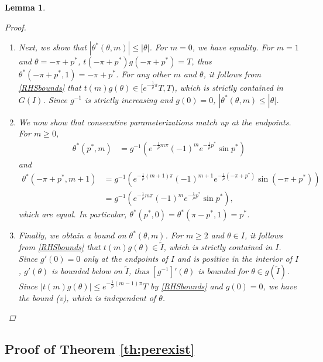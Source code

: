 \documentclass[12pt]{elsarticle}
\theoremstyle{plain}
\newtheorem{lemma}[theorem]{Lemma}
\theoremstyle{definition}
\theoremstyle{remark}
\numberwithin{theorem}{section}
\numberwithin{equation}{section}
\begin{document}
\begin{lemma}
\begin{proof}
\begin{enumerate}
\item Next, we show that $|\theta^*(\theta, m)| \leq |\theta|$. For $m = 0$, we have equality. For $m = 1$ and $\theta = -\pi + p^*$, $t(-\pi + p^*)g(-\pi + p^*) = T$, thus $\theta^*(-\pi + p^*, 1) = -\pi + p^*$. For any other $m$ and $\theta$, it follows from \cref{RHSbounds} that $t(m)g(\theta) \in [e^{-\frac{1}{\rho}\pi}T, T)$, which is strictly contained in $G(I)$. Since $g^{-1}$ is strictly increasing and $g(0) = 0$, $|\theta^*(\theta, m) \leq |\theta|$.

\item We now show that consecutive parameterizations match up at the endpoints. For $m \geq 0$, 
\begin{align*}
\theta^*(p^*, m) &= g^{-1}\left( e^{-\frac{1}{\rho}m \pi} (-1)^m e^{-\frac{1}{\rho}p^*} \sin p^* \right)
\end{align*}
and
\begin{align*}
\theta^*(-\pi + p^*, m+1) &= g^{-1}\left( e^{-\frac{1}{\rho}(m+1) \pi} (-1)^{m+1} e^{-\frac{1}{\rho}(-\pi + p^*)} \sin (-\pi + p^*) \right) \\
&=g^{-1}\left( e^{-\frac{1}{\rho}m \pi} (-1)^m e^{-\frac{1}{\rho}p^*} \sin p^* \right),
\end{align*}
which are equal. In particular, $\theta^*(p^*, 0) = \theta^*(\pi - p^*, 1) = p^*$.

\item Finally, we obtain a bound on $\theta^*(\theta, m)$. For $m \geq 2$ and $\theta \in I$, it follows from \cref{RHSbounds} that $t(m)g(\theta) \in \tilde{I}$, which is strictly contained in $I$. Since $g'(0) = 0$ only at the endpoints of $I$ and is positive in the interior of $I$, $g'(\theta)$ is bounded below on $\tilde{I}$, thus $[g^{-1}]'(\theta)$ is bounded for $\theta \in g(\tilde{I})$. Since $|t(m)g(\theta)| \leq e^{-\frac{1}{\rho}(m - 1)\pi}T$ by \cref{RHSbounds} and $g(0) = 0$, we have the bound (v), which is independent of $\theta$.
\end{enumerate}
\end{proof}
\end{lemma}

\subsection{Proof of Theorem \ref{th:perexist}}
\end{document}
